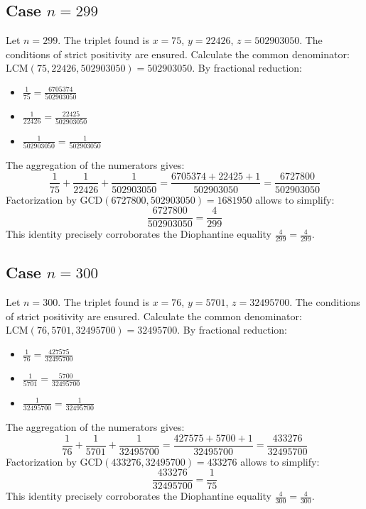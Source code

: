 \documentclass[11pt,a4paper]{article}
\begin{document}
\subsection{Case $n = 299$}
Let $n = 299$. The triplet found is $x = 75$, $y = 22426$, $z = 502903050$.
The conditions of strict positivity are ensured.
Calculate the common denominator: $\text{LCM}(75, 22426, 502903050) = 502903050$.
By fractional reduction:
\begin{itemize}
    \item $\frac{1}{75} = \frac{6705374}{502903050}$
    \item $\frac{1}{22426} = \frac{22425}{502903050}$
    \item $\frac{1}{502903050} = \frac{1}{502903050}$
\end{itemize}
The aggregation of the numerators gives:
$$ \frac{1}{75} + \frac{1}{22426} + \frac{1}{502903050} = \frac{6705374 + 22425 + 1}{502903050} = \frac{6727800}{502903050} $$
Factorization by $\text{GCD}(6727800, 502903050) = 1681950$ allows to simplify:
$$ \frac{6727800}{502903050} = \frac{4}{299} $$
This identity precisely corroborates the Diophantine equality $\frac{4}{299} = \frac{4}{299}$.

\subsection{Case $n = 300$}
Let $n = 300$. The triplet found is $x = 76$, $y = 5701$, $z = 32495700$.
The conditions of strict positivity are ensured.
Calculate the common denominator: $\text{LCM}(76, 5701, 32495700) = 32495700$.
By fractional reduction:
\begin{itemize}
    \item $\frac{1}{76} = \frac{427575}{32495700}$
    \item $\frac{1}{5701} = \frac{5700}{32495700}$
    \item $\frac{1}{32495700} = \frac{1}{32495700}$
\end{itemize}
The aggregation of the numerators gives:
$$ \frac{1}{76} + \frac{1}{5701} + \frac{1}{32495700} = \frac{427575 + 5700 + 1}{32495700} = \frac{433276}{32495700} $$
Factorization by $\text{GCD}(433276, 32495700) = 433276$ allows to simplify:
$$ \frac{433276}{32495700} = \frac{1}{75} $$
This identity precisely corroborates the Diophantine equality $\frac{4}{300} = \frac{4}{300}$.
\end{document}
